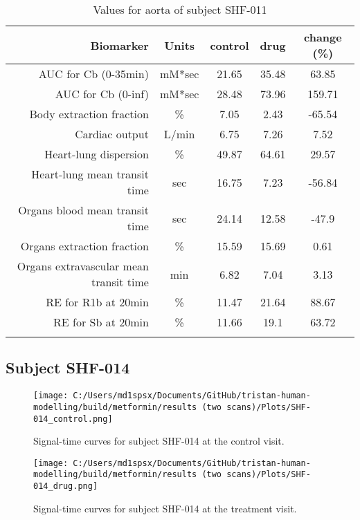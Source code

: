 \documentclass{epflreport}%
\begin{document}
\begin{longtable}{rcccc}%
\hline%
Biomarker&Units&control&drug&change (\%)\\%
\hline%
AUC for Cb (0{-}35min)&mM*sec&21.65&35.48&63.85\\%
AUC for Cb (0{-}inf)&mM*sec&28.48&73.96&159.71\\%
Body extraction fraction&\%&7.05&2.43&{-}65.54\\%
Cardiac output&L/min&6.75&7.26&7.52\\%
Heart{-}lung dispersion&\%&49.87&64.61&29.57\\%
Heart{-}lung mean transit time&sec&16.75&7.23&{-}56.84\\%
Organs blood mean transit time&sec&24.14&12.58&{-}47.9\\%
Organs extraction fraction&\%&15.59&15.69&0.61\\%
Organs extravascular mean transit time&min&6.82&7.04&3.13\\%
RE for R1b at 20min&\%&11.47&21.64&88.67\\%
RE for Sb at 20min&\%&11.66&19.1&63.72\\%
\hline%
\caption{Values for aorta of subject SHF-011} \\%
\end{longtable}%
\clearpage%
\subsection{Subject SHF{-}014}%
\label{subsec:SubjectSHF{-}014}%

%


\begin{figure}[h!]%
\centering%
\texttt{[image: C:/Users/md1spsx/Documents/GitHub/tristan-human-modelling/build/metformin/results (two scans)/Plots/SHF-014\_control.png]}%
\caption{Signal{-}time curves for subject SHF{-}014 at the control visit.}%
\end{figure}

%


\begin{figure}[h!]%
\centering%
\texttt{[image: C:/Users/md1spsx/Documents/GitHub/tristan-human-modelling/build/metformin/results (two scans)/Plots/SHF-014\_drug.png]}%
\caption{Signal{-}time curves for subject SHF{-}014 at the treatment visit.}%
\end{figure}
\end{document}
